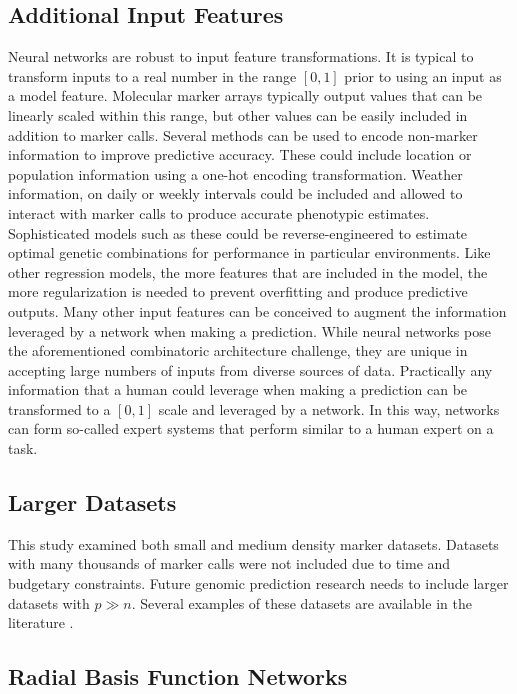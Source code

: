 \subsection*{Additional Input Features}

Neural networks are robust to input feature transformations. It is typical 
to transform inputs to a real number in the range $[0,1]$ prior to using 
an input as a model feature. Molecular marker arrays typically output values that
can be linearly scaled within this range, but other values can be easily included
in addition to marker calls. Several methods can be used to encode non-marker information
to improve predictive accuracy. These could include location or population information using
a one-hot encoding transformation. Weather information, on daily or weekly intervals could
be included and allowed to interact with marker calls to produce accurate phenotypic estimates.
Sophisticated models such as these could be reverse-engineered to estimate optimal
genetic combinations for performance in particular environments. Like other regression
models, the more features that are included in the model, the more regularization is needed
to prevent overfitting and produce predictive outputs. Many other input features
can be conceived to augment the information leveraged by a network when making
a prediction. While neural networks pose the aforementioned combinatoric architecture
challenge, they are unique in accepting large numbers of inputs from diverse 
sources of data. Practically any information that a human could leverage when making
a prediction can be transformed to a $[0,1]$ scale and leveraged by a
network. In this way, networks can form so-called expert systems that perform
similar to a human expert on a task.

\subsection*{Larger Datasets}

This study examined both small and medium density marker datasets. Datasets with
many thousands of marker calls were not included due to time and budgetary constraints.
Future genomic prediction research needs to include larger datasets with $p \gg n$. Several
examples of these datasets are available in the literature \citep{resende2012, cleveland2012}.

\subsection*{Radial Basis Function Networks}

